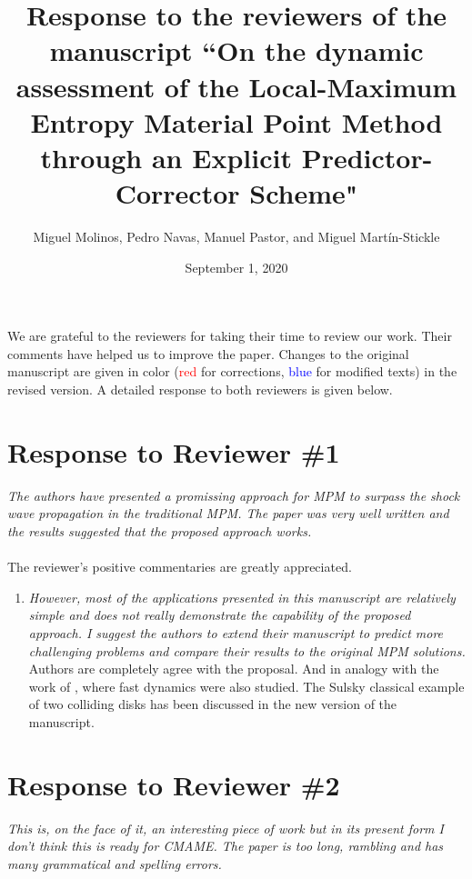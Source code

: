 \documentclass[12pt]{article}
\title{Response to the reviewers of the manuscript ``On the dynamic assessment of the Local-Maximum Entropy Material Point Method through an Explicit Predictor-Corrector Scheme"}
\author{Miguel Molinos, Pedro Navas, Manuel Pastor, and Miguel Mart\'in-Stickle}
\date{September 1, 2020}
\begin{document}
\maketitle

We  are grateful to the reviewers for taking their time  to review our work. Their comments have helped us to improve the paper. Changes to the original manuscript are given in  color (\textcolor{red}{red} for corrections, \textcolor{blue}{blue} for modified texts)  in the revised version.  A detailed response to both reviewers is given below.

\section*{Response to Reviewer \#1}
{\it
The authors have presented a promissing approach for MPM to surpass the shock wave propagation in the traditional MPM. The paper was very well written and the results suggested that the proposed approach works.
}
\\
\\
The reviewer's positive commentaries are greatly appreciated.
\\
\begin{enumerate}
\item \textit{However, most of the applications presented in this manuscript are relatively simple and does not really demonstrate the capability of the proposed approach. I suggest the authors to extend their manuscript to predict more challenging problems and compare their results to the original MPM solutions.}\\

Authors are completely agree with the proposal. And in analogy with the work of \cite{HAMMERQUIST2017724}, where fast dynamics were also studied. The Sulsky classical example of two colliding disks has been discussed in the new version of the manuscript.

\end{enumerate}

\hspace{5mm}



\section*{Response to Reviewer \#2}


\textit {This is, on the face of it, an interesting piece of work but in its present form I don't think this is ready for CMAME. The paper is too long, rambling and has many grammatical and spelling errors. }\\
\end{document}
